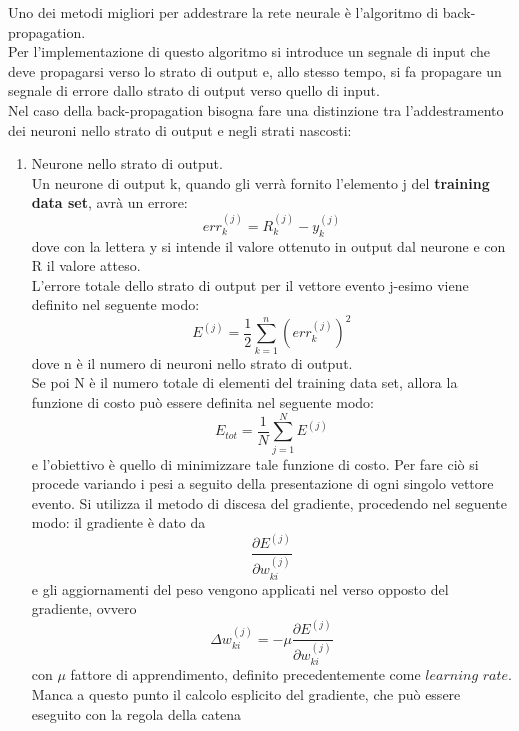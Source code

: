 Uno dei metodi migliori per addestrare la rete neurale è l'algoritmo di back-propagation. \\
Per l'implementazione di questo algoritmo si introduce un segnale di input che deve propagarsi verso lo strato di output e, allo stesso tempo, si fa propagare un segnale di errore dallo strato di output verso quello di input.\\
Nel caso della back-propagation bisogna fare una distinzione tra l'addestramento dei neuroni nello strato di output e negli strati nascosti:
\begin{enumerate}
	\item Neurone nello strato di output.\\
	Un neurone di output k, quando gli verrà fornito l'elemento j del \textbf{training data set}, avrà un errore:
	\begin{equation}
	err_k^{(j)} = R_k^{(j)} - y_k^{(j)}
	\end{equation}
	dove con la lettera y si intende il valore ottenuto in output dal neurone e con R il valore atteso. \\
	L'errore totale dello strato di output per il vettore evento j-esimo viene definito nel seguente modo:
	\begin{equation}
	E^{(j)} = \frac{1}{2} \sum_{k=1}^{n} (err_k^{(j)})^2
	\end{equation}
	dove n è il numero di neuroni nello strato di output. \\
	Se poi N è il numero totale di elementi del training data set, allora la funzione di costo può essere definita nel seguente modo:
	\begin{equation}
	E_{tot} = \frac{1}{N}\sum_{j=1}^{N} E^{(j)}
	\end{equation}
	e l'obiettivo è quello di minimizzare tale funzione di costo. Per fare ciò si procede variando i pesi a seguito della presentazione di ogni singolo vettore evento.
	Si utilizza il metodo di discesa del gradiente, procedendo nel seguente modo: il gradiente è dato da
	\begin{equation}
	\frac{\partial E^{(j)} }{\partial w_{ki}^{(j)}}
	\end{equation}
	e gli aggiornamenti del peso vengono applicati nel verso opposto del gradiente, ovvero
	\begin{equation}
	\Delta w_{ki}^{(j)} = -\mu \frac{\partial E^{(j)} }{\partial w_{ki}^{(j)}}
	\end{equation}
	con $\mu$ fattore di apprendimento, definito precedentemente come $\textit{learning rate}$.
	Manca a questo punto il calcolo esplicito del gradiente, che può essere eseguito con la regola della catena 

\end{enumerate}
